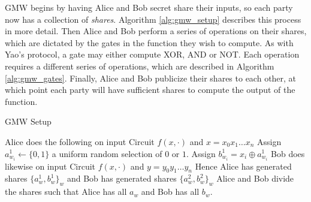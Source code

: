 GMW begins by having Alice and Bob secret share their inputs, so each party now has a collection of \textit{shares}. 
Algorithm \ref{alg:gmw_setup} describes this process in more detail.
Then Alice and Bob perform a series of operations on their shares, which are dictated by the gates in the function they wish to compute.
As with Yao's protocol, a gate may either compute XOR, AND or NOT.
Each operation requires a different series of operations, which are described in Algorithm \ref{alg:gmw_gates}.
Finally, Alice and Bob publicize their shares to each other, at which point each party will have sufficient shares to compute the output of the function.

\begin{algorithm}[h!]
\caption{GMW Setup}
\label{alg:gmw_setup}
\begin{algorithmic}
    \State Alice does the following on input Circuit $f(x,\cdot)$ and $x = x_0x_1\ldots x_n$
        \State Assign $a^1_{w_i} \leftarrow \{0,1\}$
        \Comment a uniform random selection of $0$ or $1$.
        \State Assign $b^1_{w_i} = x_i \oplus a_{w_i}^1$
    \EndFor
    \State Bob does likewise on input Circuit $f(x,\cdot)$ and $y = y_0y_1\ldots y_n$
    \State Hence Alice has generated shares $\{a^1_w, b^1_w\}_w$ 
    \State and Bob has generated shares $\{a^2_w, b^2_w\}_w$
    \State Alice and Bob divide the shares such that Alice has all $a_w$ and Bob has all $b_w$.
\end{algorithmic}
\end{algorithm}

